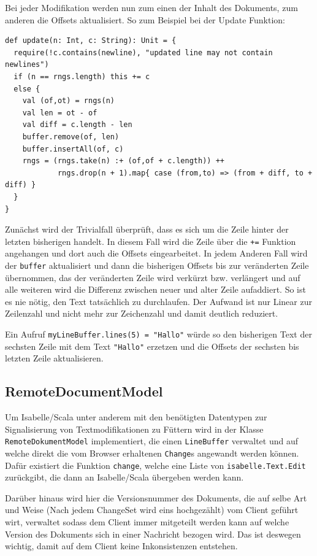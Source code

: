 Bei jeder Modifikation werden nun zum einen der Inhalt des Dokuments, zum anderen die Offsets
aktualisiert. So zum Beispiel bei der Update Funktion:

\begin{lstlisting}
def update(n: Int, c: String): Unit = {
  require(!c.contains(newline), "updated line may not contain newlines")
  if (n == rngs.length) this += c
  else {      
    val (of,ot) = rngs(n)
    val len = ot - of
    val diff = c.length - len
    buffer.remove(of, len)
    buffer.insertAll(of, c)
    rngs = (rngs.take(n) :+ (of,of + c.length)) ++ 
            rngs.drop(n + 1).map{ case (from,to) => (from + diff, to + diff) }
  }
}    
\end{lstlisting}

Zunächst wird der Trivialfall überprüft, dass es sich um die Zeile hinter der letzten bisherigen
handelt. In diesem Fall wird die Zeile über die \texttt{+=} Funktion angehangen und dort auch die
Offsets eingearbeitet. In jedem Anderen Fall wird der \texttt{buffer} aktualisiert und dann die
bisherigen Offsets bis zur veränderten Zeile übernommen, das der veränderten Zeile wird verkürzt
bzw. verlängert und auf alle weiteren wird die Differenz zwischen neuer und alter Zeile aufaddiert.
So ist es nie nötig, den Text tatsächlich zu durchlaufen. Der Aufwand ist nur Linear zur Zeilenzahl
und nicht mehr zur Zeichenzahl und damit deutlich reduziert.

Ein Aufruf \texttt{myLineBuffer.lines(5) = "Hallo"} würde so den bisherigen Text der sechsten Zeile
mit dem Text \texttt{"Hallo"} erzetzen und die Offsets der sechsten bis letzten Zeile aktualisieren.

\subsection{RemoteDocumentModel}

Um Isabelle/Scala unter anderem mit den benötigten Datentypen zur Signalisierung von
Textmodifikationen zu Füttern wird in der Klasse \texttt{RemoteDokumentModel} implementiert, die
einen \texttt{LineBuffer} verwaltet und auf welche direkt die vom Browser erhaltenen
\texttt{Change}s angewandt werden können. Dafür existiert die Funktion \texttt{change}, welche eine
Liste von \texttt{isabelle.Text.Edit} zurückgibt, die dann an Isabelle/Scala übergeben werden kann.

Darüber hinaus wird hier die Versionsnummer des Dokuments, die auf selbe Art und Weise (Nach jedem
ChangeSet wird eins hochgezählt) vom Client geführt wirt, verwaltet sodass dem Client immer
mitgeteilt werden kann auf welche Version des Dokuments sich in einer Nachricht bezogen wird. Das
ist deswegen wichtig, damit auf dem Client keine Inkonsistenzen entstehen.

